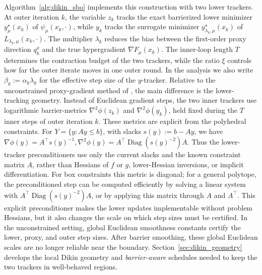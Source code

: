 \documentclass{article}
\begin{document}
Algorithm~\ref{alg:dikin_sbo} implements this construction with two lower trackers. At outer
iteration \(k\), the variable \(z_k\) tracks the exact barrierized lower minimizer \(y_\mu^\star(x_k)\)
of \(\psi_\mu(x_k,\cdot)\), while \(y_k\) tracks the surrogate minimizer
\(y_{\lambda_k,\mu}^\star(x_k)\) of \(L_{\lambda_k,\mu}(x_k,\cdot)\). The multiplier
\(\lambda_k\) reduces the bias between the first-order proxy direction \(q_k^x\) and the true
hypergradient \(\nabla F_\mu(x_k)\). The inner-loop length \(T\) determines the contraction budget
of the two trackers, while the ratio \(\xi\) controls how far the outer iterate moves in one outer
round. In the analysis we also write \(\beta_k:=\alpha_k\lambda_k\) for the effective step size of the
\(y\)-tracker. Relative to the unconstrained proxy-gradient method of \citet{kwon2023fully}, the main difference is the lower-tracking geometry. Instead
of Euclidean gradient steps, the two inner trackers use logarithmic barrier-metrics
\(\nabla^2\phi(z_k)\) and \(\nabla^2\phi(y_k)\), held fixed during the \(T\) inner steps of outer
iteration \(k\). These metrics are explicit from the polyhedral constraints. For
\(Y=\{y:Ay\le b\}\), with slacks \(s(y):=b-Ay\), we have
\(\nabla\phi(y)=A^\top s(y)^{-1},
\nabla^2\phi(y)=A^\top\operatorname{Diag}(s(y)^{-2})A .\)
Thus the lower-tracker preconditioners use only the current slacks and the known constraint matrix
\(A\), rather than Hessians of \(f\) or \(g\), lower-Hessian inversions, or implicit differentiation.
For box constraints this metric is diagonal; for a general polytope, the preconditioned step can be
computed efficiently by solving a linear system with
\(A^\top\operatorname{Diag}(s(y)^{-2})A\), or by applying this matrix through \(A\) and \(A^\top\).
This explicit preconditioner makes the lower updates implementable without problem Hessians, but it
also changes the scale on which step sizes must be certified. In the unconstrained setting, global
Euclidean smoothness constants certify the lower, proxy, and outer step sizes. After barrier
smoothing, these global Euclidean scales are no longer reliable near the boundary.
Section~\ref{sec:dikin_geometry} develops the local Dikin geometry and \textit{barrier-aware} schedules
needed to keep the two trackers in well-behaved regions.
\end{document}
